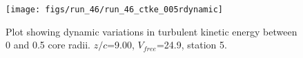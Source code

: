 \begin{figure}[H]
\centering
\texttt{[image: figs/run\_46/run\_46\_ctke\_005rdynamic]}
\caption{Plot showing dynamic variations in turbulent kinetic energy between 0 and 0.5 core radii. $z/c$=9.00, $V_{free}$=24.9, station 5.}
\label{fig:run_46_ctke_005rdynamic}
\end{figure}


